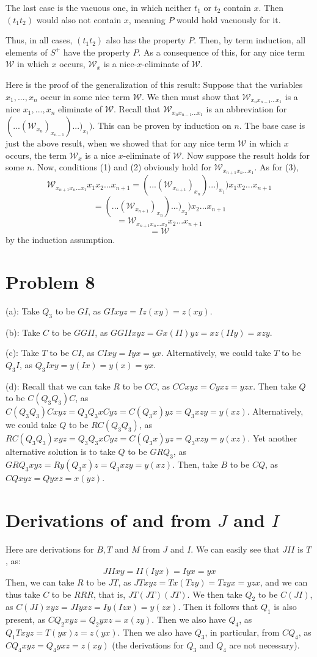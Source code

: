 \documentclass{article}
\theoremstyle{definition}
\begin{document}
The last case is the vacuous one, in which neither $t_1$ or $t_2$ contain $x$. Then $(t_1t_2)$ would also not contain $x$, meaning $P$ would hold vacuously for it.


Thus, in all cases, $(t_1t_2)$ also has the property $P$. Then, by term induction, all elements of $S^+$ have the property $P$. As a consequence of this, 
for any nice term $\mathcal{W}$ in which $x$ occurs, $\mathcal{W}_x$ is a nice-$x$-eliminate of $\mathcal{W}$.


Here is the proof of the generalization of this result: Suppose that the variables $x_1,...,x_n$ occur in some nice term $\mathcal{W}$. We then must show that 
$\mathcal{W}_{x_nx_{n-1}...x_1}$ is a nice $x_1,...,x_n$ eliminate of $\mathcal{W}$. Recall that 
$\mathcal{W}_{x_nx_{n-1}...x_1}$ is an abbreviation for $(...(\mathcal{W}_{x_n})_{x_{n-1}})...)_{x_1})$. 
This can be proven by induction on $n$. The base case is just the above result, when 
we showed that for any nice term $\mathcal{W}$ in which $x$ occurs, the term $\mathcal{W}_x$ is a nice $x$-eliminate of $\mathcal{W}$. Now suppose the result holds for some $n$. 
Now, conditions (1) and (2) obviously hold for $\mathcal{W}_{x_{n+1}x_n...x_1}$. As for (3),
\[ \mathcal{W}_{x_{n+1}x_n...x_1}x_1x_2...x_{n+1}=(...(\mathcal{W}_{x_{n+1}})_{x_n})...)_{x_1})x_1x_2...x_{n+1} \]
\[ =(...(\mathcal{W}_{x_{n+1}})_{x_n})...)_{x_2})x_2...x_{n+1} \]
\[ =\mathcal{W}_{x_{n+1}x_n...x_2}x_2...x_{n+1} \]
\[ =\mathcal{W} \]
by the induction assumption.

\section*{Problem 8}
(a): Take $Q_3$ to be $GI$, as $GIxyz=Iz(xy)=z(xy)$.


(b): Take $C$ to be $GGII$, as $GGIIxyz=Gx(II)yz=xz(IIy)=xzy$.


(c): Take $T$ to be $CI$, as $CIxy=Iyx=yx$. Alternatively, we could take $T$ to be $Q_3I$, as $Q_3Ixy=y(Ix)=y(x)=yx$.


(d): Recall that we can take $R$ to be $CC$, as $CCxyz=Cyxz=yzx$. Then take $Q$ to be $C(Q_3Q_3)C$, as 
$C(Q_3Q_3)Cxyz=Q_3Q_3xCyz=C(Q_3x)yz=Q_3xzy=y(xz)$. Alternatively, we could take $Q$ to be $RC(Q_3Q_3)$, as 
$RC(Q_3Q_3)xyz=Q_3Q_3xCyz=C(Q_3x)yz=Q_3xzy=y(xz)$. Yet another alternative solution is to take $Q$ to be $GRQ_3$, as 
$GRQ_3xyz=Ry(Q_3x)z=Q_3xzy=y(xz)$. Then, take $B$ to be $CQ$, as $CQxyz=Qyxz=x(yz)$.

\section*{Derivations of and from $J$ and $I$}
Here are derivations for $B,T$ and $M$ from $J$ and $I$. We can easily see that $JII$ is $T$, as:
\[ JIIxy=II(Iyx)=Iyx=yx \] Then, we can take $R$ to be $JT$, as $JTxyz=Tx(Tzy)=Tzyx=yzx$, and we can thus take $C$ to be $RRR$, that is, 
$JT(JT)(JT)$. We then take $Q_2$ to be $C(JI)$, as $C(JI)xyz=JIyxz=Iy(Izx)=y(zx)$. Then it follows that $Q_1$ is also present, as 
$CQ_2xyz=Q_2yxz=x(zy)$. Then we also have $Q_4$, as $Q_1Txyz=T(yx)z=z(yx)$. Then we also have $Q_3$, in particular, from $CQ_4$, as
$CQ_4xyz=Q_4yxz=z(xy)$ (the derivations for $Q_3$ and $Q_4$ are not necessary). 
\end{document}

